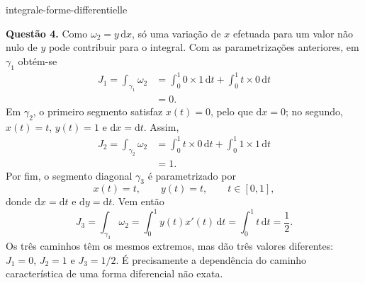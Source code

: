 \begin{exo}{integrale-forme-differentielle}
\begin{solution}
\textbf{Questão 4.} Como $\omega_2=y\,\mathrm{d}x$, só uma variação de $x$
efetuada para um valor não nulo de $y$ pode contribuir para o integral. Com as
parametrizações anteriores, em $\gamma_1$ obtém-se
\[\begin{aligned}J_1=\int_{\gamma_1}\omega_2&=\int_0^1 0\times1\,\mathrm{d}t+\int_0^1 t\times0\,\mathrm{d}t\\&=0.\end{aligned}\]
Em $\gamma_2$, o primeiro segmento satisfaz $x(t)=0$, pelo que $\mathrm{d}x=0$;
no segundo, $x(t)=t$, $y(t)=1$ e $\mathrm{d}x=\mathrm{d}t$. Assim,
\[\begin{aligned}J_2=\int_{\gamma_2}\omega_2&=\int_0^1 t\times0\,\mathrm{d}t+\int_0^1 1\times1\,\mathrm{d}t\\&=1.\end{aligned}\]
Por fim, o segmento diagonal $\gamma_3$ é parametrizado por
\[x(t)=t,\qquad y(t)=t,\qquad t\in[0,1],\]
donde $\mathrm{d}x=\mathrm{d}t$ e $\mathrm{d}y=\mathrm{d}t$. Vem então
\[J_3=\int_{\gamma_3}\omega_2=\int_0^1 y(t)x'(t)\,\mathrm{d}t=\int_0^1 t\,\mathrm{d}t=\frac12.\]
Os três caminhos têm os mesmos extremos, mas dão três valores diferentes:
$J_1=0$, $J_2=1$ e $J_3=1/2$. É precisamente a dependência do caminho
característica de uma forma diferencial não exata.
\end{solution}
\end{exo}

